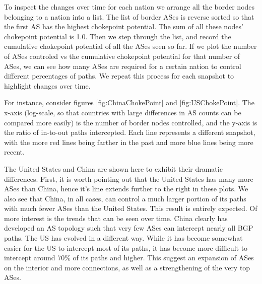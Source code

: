 \documentclass[10pt, conference, letterpaper]{IEEEtran}
\begin{document}
To inspect the changes over time for each nation we arrange all the border nodes belonging to a nation into a list. The list of border ASes is reverse sorted
so that the first AS has the highest chokepoint potential. The sum of all these nodes' chokepoint potential is 1.0. Then we step through the list, and record
the cumulative chokepoint potential of all the ASes seen so far. If we plot the number of ASes controled vs the cumulative chokepoint potential for that number
of ASes, we can see how many ASes are required for a certain nation to control different percentages of paths. We repeat this process for each snapshot to highlight
changes over time.

\par
For instance, consider figures \ref{fig:ChinaChokePoint} and \ref{fig:USChokePoint}. 
The x-axis (log-scale, so that countries with large differences in AS counts can be compared more easily)
is the number of border nodes controlled, and the y-axis is the ratio of in-to-out paths intercepted. Each line represents a different snapshot, with the more red lines being
farther in the past and more blue lines being more recent.

\par
The United States and China are shown here to exhibit their dramatic differences. First, it is worth pointing out that the United States has many more ASes than China, hence
it's line extends further to the right in these plots. We also see that China, in all cases, can control a much larger portion of its paths with much fewer ASes than the
United States. This result is entirely expected. Of more interest is the trends that can be seen over time. China clearly has developed an AS topology such that very few
ASes can intercept nearly all BGP paths. The US has evolved in a different way. While it has become somewhat easier for the US to intercept most of its paths, it has become
more difficult to intercept around 70\% of its paths and higher. This suggest an expansion of ASes on the interior and more connections, as well as a strengthening of
the very top ASes.
\end{document}

